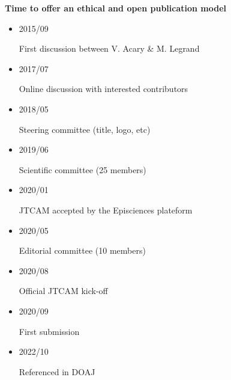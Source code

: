\documentclass[10pt,compress,serif,aspectratio=169]{beamer}
\begin{document}
\begin{frame}[t]
 \vskip1cm

 \begin{center}
   \Large
   \textbf{Time to offer an ethical and open publication model}
 \end{center}

 \begin{itemize}
  \item \parbox{1.5cm}{2015/09} First discussion between V. Acary \& M. Legrand\\[.5em]
  \item \parbox{1.5cm}{2017/07} Online discussion with interested contributors\\[.5em]
  \item \parbox{1.5cm}{2018/05} Steering committee (title, logo, etc)\\[.5em]
  \item \parbox{1.5cm}{2019/06} Scientific committee (25 members)\\[.5em]
  \item \parbox{1.5cm}{2020/01} JTCAM accepted by the Episciences plateform\\[.5em]
  \item \parbox{1.5cm}{2020/05} Editorial committee (10 members)\\[.5em]
  \item \parbox{1.5cm}{2020/08} Official JTCAM kick-off\\[.5em]
  \item \parbox{1.5cm}{2020/09} First submission
  \item \parbox{1.5cm}{2022/10} Referenced in DOAJ
 \end{itemize}

\end{frame}


\end{document}
